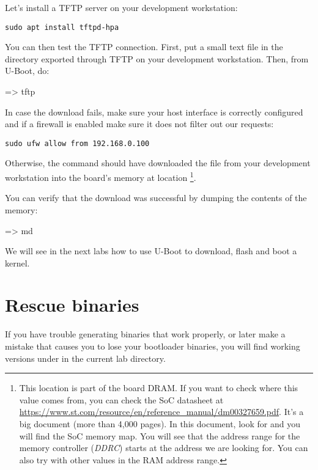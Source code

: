 Let's install a TFTP server on your development workstation:

\begin{verbatim}
sudo apt install tftpd-hpa
\end{verbatim}

You can then test the TFTP connection. First, put a small text file in
the directory exported through TFTP on your development
workstation. Then, from U-Boot, do:

\begin{ubootinput}
=> tftp %
\end{ubootinput}

In case the download fails, make sure your host interface is correctly
configured and if a firewall is enabled make sure it does not filter out our
requests:
\begin{verbatim}
sudo ufw allow from 192.168.0.100
\end{verbatim}

Otherwise, the  command should have downloaded the
 file from your development workstation into
the board's memory at location {\tt \zimageboardaddr}\footnote{
This location is part of the board DRAM. If you want
to check where this value comes from, you can check the SoC
datasheet at
\url{https://www.st.com/resource/en/reference_manual/dm00327659.pdf}.
It's a big document (more than 4,000 pages). In this document, look
for  and you will find the SoC memory map.
You will see that the address range for the memory controller
({\em DDRC})
starts at the address we are looking for.
You can also try with other values in the RAM address range.}.

You can verify that the download was successful by dumping the
contents of the memory:

\begin{ubootinput}
=> md %
\end{ubootinput}

We will see in the next labs how to use U-Boot to download, flash and
boot a kernel.

\section{Rescue binaries}

If you have trouble generating binaries that work properly, or later
make a mistake that causes you to lose your bootloader binaries, you
will find working versions under  in the current lab
directory.
